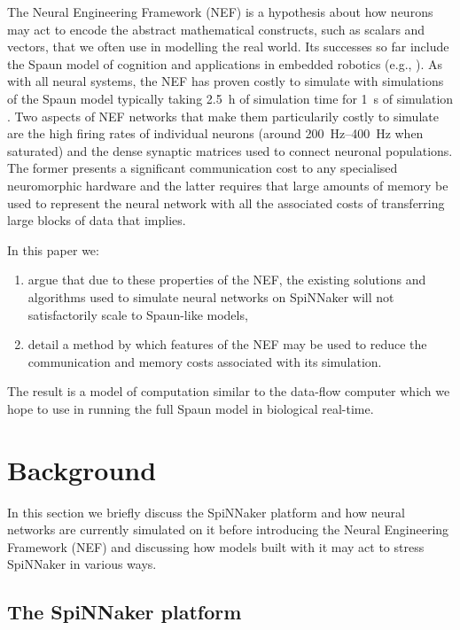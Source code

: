 \documentclass[conference]{IEEEtran}
\begin{document}
The Neural Engineering Framework (NEF) \parencite{Eliasmith2004} is a hypothesis about how neurons may act to encode the abstract mathematical constructs, such as scalars and vectors, that we often use in modelling the real world. Its successes so far include the Spaun model of cognition \parencite{Eliasmith2012} and applications in embedded robotics (e.g., \parencite{Stewart2015ip}). As with all neural systems, the NEF has proven costly to simulate with simulations of the Spaun model typically taking \SI{2.5}{\hour} of simulation time for \SI{1}{\second} of simulation \parencite[\S V]{Stewart2014}. Two aspects of NEF networks that make them particularily costly to simulate are the high firing rates of individual neurons (around \SIrange{200}{400}{\hertz} when saturated) and the dense synaptic matrices used to connect neuronal populations. The former presents a significant communication cost to any specialised neuromorphic hardware and the latter requires that large amounts of memory be used to represent the neural network with all the associated costs of transferring large blocks of data that implies.

  In this paper we:
  \begin{enumerate}
    \item argue that due to these properties of the NEF, the existing solutions and algorithms used to simulate neural networks on SpiNNaker will not satisfactorily scale to Spaun-like models,
    \item detail a method by which features of the NEF may be used to reduce the communication and memory costs associated with its simulation.
  \end{enumerate}

The result is a model of computation similar to the data-flow computer which we hope to use in running the full Spaun model in biological real-time.

  \section{Background}

In this section we briefly discuss the SpiNNaker platform and how neural networks are currently simulated on it before introducing the Neural Engineering Framework (NEF) and discussing how models built with it may act to stress SpiNNaker in various ways.

  \subsection{The SpiNNaker platform}
\end{document}
